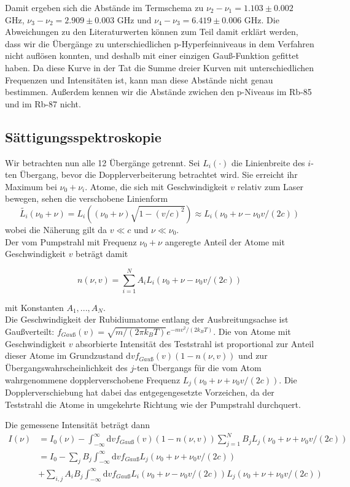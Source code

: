 \documentclass[a4paper,parskip]{scrartcl}
\begin{document}
Damit ergeben sich die Abstände im Termschema zu $\nu_2 - \nu_1 = 1.103 \pm 0.002$ GHz,  $\nu_3 - \nu_2 = 2.909 \pm 0.003$ GHz und $\nu_4 - \nu_3 = 6.419 \pm 0.006$ GHz. Die Abweichungen zu den Literaturwerten können zum Teil damit erklärt werden, dass wir die Übergänge zu unterschiedlichen p-Hyperfeinniveaus in dem Verfahren nicht auflösen konnten, und deshalb mit einer einzigen Gauß-Funktion gefittet haben. Da diese Kurve in der Tat die Summe dreier Kurven mit unterschiedlichen Frequenzen und Intensitäten ist, kann man diese Abstände nicht genau bestimmen. Außerdem kennen wir die Abstände zwichen den p-Niveaus im Rb-85 und im Rb-87 nicht.

\subsection{Sättigungsspektroskopie}

Wir betrachten nun alle 12 Übergänge getrennt. Sei $L_i(\cdot )$ die Linienbreite des $i$-ten Übergang, bevor die Dopplerverbeiterung betrachtet wird. Sie erreicht ihr Maximum bei $\nu_0+\nu_i$. Atome, die sich mit Geschwindigkeit $v$ relativ zum Laser bewegen, sehen die verschobene Linienform
$$\tilde{L_i}(\nu_0+\nu) = L_i((\nu_0+\nu)\sqrt{1-(v/c)^2}) \approx L_i(\nu_0+\nu-\nu_0 v/(2c))$$
wobei die Näherung gilt da $v \ll c$ und $\nu \ll \nu_0$.\\
  Der vom Pumpstrahl mit Frequenz $\nu_0+\nu$ angeregte Anteil der Atome mit Geschwindigkeit $v$ beträgt damit

$$n(\nu, v) = \sum_{i=1}^N A_i L_i(\nu_0+\nu-\nu_0 v/(2c))$$

mit Konstanten $A_1, ..., A_N$.\\

Die Geschwindigkeit der Rubidiumatome entlang der Ausbreitungsachse ist Gaußverteilt: $f_{Gauß}(v) = \sqrt{m/(2\pi k_B T)} e^{-mv^2/(2k_BT)}$. Die von Atome mit Geschwindigkeit $v$ absorbierte Intensität des Teststrahl ist proportional zur Anteil dieser Atome im Grundzustand $\mathrm{d}v f_{Gauß}(v)(1-n(\nu, v))$ und zur Übergangswahrscheinlichkeit des $j$-ten Übergangs für die vom Atom wahrgenommene dopplerverschobene Frequenz $L_j(\nu_0+\nu+\nu_0 v/(2c))$. Die Dopplerverschiebung hat dabei das entgegengesetzte Vorzeichen, da der Teststrahl die Atome in umgekehrte Richtung wie der Pumpstrahl durchquert.

 Die gemessene Intensität beträgt dann
\begin{align*}
I(\nu) &= I_0(\nu)-\int_{-\infty}^{\infty} \mathrm{d}v f_{Gauß}(v)(1-n(\nu, v))\sum_{j=1}^N B_j L_j(\nu_0+\nu+\nu_0 v/(2c)) \\
&= I_0 -\sum_j B_j \int_{-\infty}^{\infty} \mathrm{d}v f_{Gauß} L_j(\nu_0+\nu+\nu_0 v/(2c)) \\
&+\sum_{i,j} A_iB_j \int_{-\infty}^{\infty} \mathrm{d}v f_{Gauß} L_i(\nu_0+\nu-\nu_0 v/(2c)) L_j(\nu_0+\nu+\nu_0 v/(2c))
\end{align*}
\end{document}
